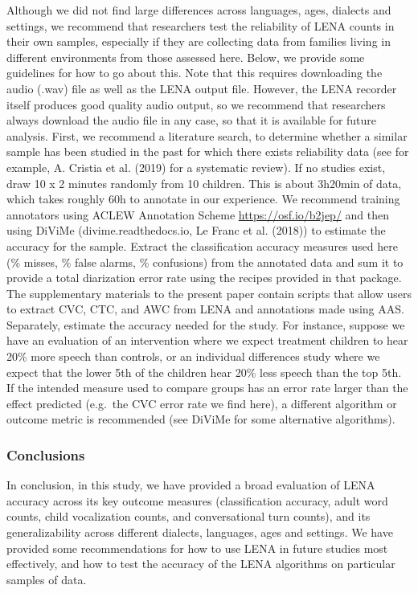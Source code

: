 \documentclass[english,floatsintext,man]{apa6}
\begin{document}
Although we did not find large differences across languages, ages,
dialects and settings, we recommend that researchers test the
reliability of LENA counts in their own samples, especially if they are
collecting data from families living in different environments from
those assessed here. Below, we provide some guidelines for how to go
about this. Note that this requires downloading the audio (.wav) file as
well as the LENA output file. However, the LENA recorder itself produces
good quality audio output, so we recommend that researchers always
download the audio file in any case, so that it is available for future
analysis. First, we recommend a literature search, to determine whether
a similar sample has been studied in the past for which there exists
reliability data (see for example, A. Cristia et al. (2019) for a
systematic review). If no studies exist, draw 10 x 2 minutes randomly
from 10 children. This is about 3h20min of data, which takes roughly 60h
to annotate in our experience. We recommend training annotators using
ACLEW Annotation Scheme \url{https://osf.io/b2jep/} and then using
DiViMe (divime.readthedocs.io, Le Franc et al. (2018)) to estimate the
accuracy for the sample. Extract the classification accuracy measures
used here (\% misses, \% false alarms, \% confusions) from the annotated
data and sum it to provide a total diarization error rate using the
recipes provided in that package. The supplementary materials to the
present paper contain scripts that allow users to extract CVC, CTC, and
AWC from LENA and annotations made using AAS. Separately, estimate the
accuracy needed for the study. For instance, suppose we have an
evaluation of an intervention where we expect treatment children to hear
20\% more speech than controls, or an individual differences study where
we expect that the lower 5th of the children hear 20\% less speech than
the top 5th. If the intended measure used to compare groups has an error
rate larger than the effect predicted (e.g.~the CVC error rate we find
here), a different algorithm or outcome metric is recommended (see
DiViMe for some alternative algorithms).

\subsubsection{Conclusions}\label{conclusions}

In conclusion, in this study, we have provided a broad evaluation of
LENA accuracy across its key outcome measures (classification accuracy,
adult word counts, child vocalization counts, and conversational turn
counts), and its generalizability across different dialects, languages,
ages and settings. We have provided some recommendations for how to use
LENA in future studies most effectively, and how to test the accuracy of
the LENA algorithms on particular samples of data.
\end{document}
